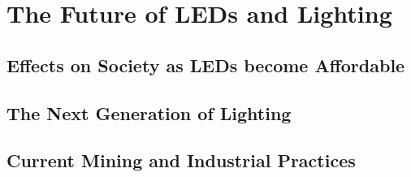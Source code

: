 \section{The Future of LEDs and
Lighting}\label{the-future-of-leds-and-lighting}

\subsection{Effects on Society as LEDs become
Affordable}\label{effects-on-society-as-leds-become-affordable}

\subsection{The Next Generation of
Lighting}\label{the-next-generation-of-lighting}

\subsection{Current Mining and Industrial
Practices}\label{current-mining-and-industrial-practices}
